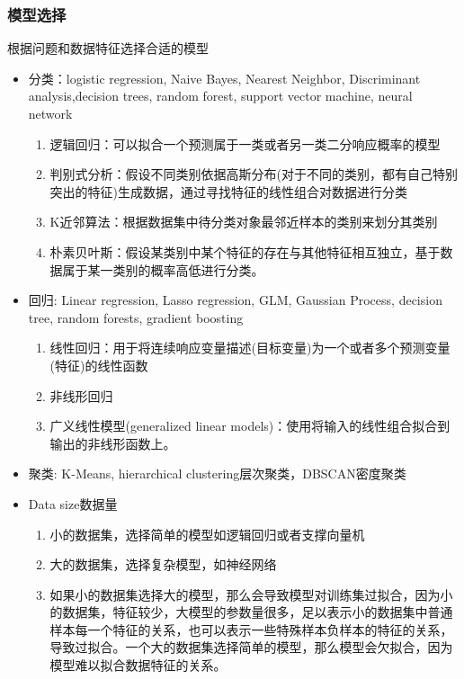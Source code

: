 \documentclass[UTF8]{ctexart}
\begin{document}
\subsubsection{模型选择}
根据问题和数据特征选择合适的模型
\begin{itemize}
    \item 分类：logistic regression, Naive Bayes, Nearest Neighbor, Discriminant analysis,decision trees, random forest, support vector machine, neural network
    \begin{enumerate}
        \item 逻辑回归：可以拟合一个预测属于一类或者另一类二分响应概率的模型
        \item 判别式分析：假设不同类别依据高斯分布(对于不同的类别，都有自己特别突出的特征)生成数据，通过寻找特征的线性组合对数据进行分类
        \item K近邻算法：根据数据集中待分类对象最邻近样本的类别来划分其类别
        \item 朴素贝叶斯：假设某类别中某个特征的存在与其他特征相互独立，基于数据属于某一类别的概率高低进行分类。
    \end{enumerate}
    \item 回归: Linear regression, Lasso regression, GLM, Gaussian Process, decision tree, random forests, gradient boosting
    \begin{enumerate}
        \item 线性回归：用于将连续响应变量描述(目标变量)为一个或者多个预测变量(特征)的线性函数
        \item 非线形回归
        \item 广义线性模型(generalized linear models)：使用将输入的线性组合拟合到输出的非线形函数上。
    \end{enumerate}
    \item 聚类: K-Means, hierarchical clustering层次聚类，DBSCAN密度聚类
    \item Data size数据量
    \begin{enumerate}
        \item 小的数据集，选择简单的模型如逻辑回归或者支撑向量机
        \item 大的数据集，选择复杂模型，如神经网络
        \item 如果小的数据集选择大的模型，那么会导致模型对训练集过拟合，因为小的数据集，特征较少，大模型的参数量很多，足以表示小的数据集中普通样本每一个特征的关系，也可以表示一些特殊样本负样本的特征的关系，导致过拟合。一个大的数据集选择简单的模型，那么模型会欠拟合，因为模型难以拟合数据特征的关系。
    \end{enumerate}

\end{itemize}
\end{document}
